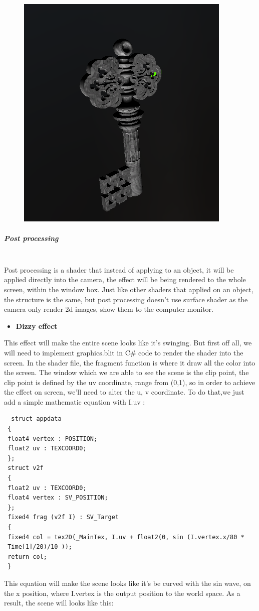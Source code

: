 \documentclass[a4paper, 13pt]{extarticle}
\begin{document}
{\begin{figure}[h]
			\begin{minipage}{1\textwidth}
				\centering
				\includegraphics[width=0.3\linewidth]{intructions/light_react.png}
				\centering
			\end{minipage}
	\end{figure}
\subparagraph{Post processing} ~\\
Post processing is a shader that instead of applying to an object, it will be applied directly into the camera, the effect will be being rendered to the whole screen, within the window box. Just like other shaders that applied on an object, the structure is the same, but post processing doesn't use surface shader as the camera only render 2d images, show them to the computer monitor.
\begin{itemize}
	\item \bfseries Dizzy effect 
\end{itemize} 
 This effect will make the entire scene looks like it's swinging. But first off all, we will need to implement graphics.blit in C\# code to render the shader into the screen. In the shader file, the fragment function is where it draw all the color into the screen. The window which we are able to see the scene is the clip point, the clip point is defined by the uv coordinate, range from (0,1), so in order to achieve the effect on screen, we'll need to alter the u, v coordinate. To do that,we just add a simple mathematic equation with I.uv : 
 \begin{lstlisting}
  struct appdata
 {
 float4 vertex : POSITION;
 float2 uv : TEXCOORD0;
 };
 struct v2f
 {
 float2 uv : TEXCOORD0;
 float4 vertex : SV_POSITION;
 };
 fixed4 frag (v2f I) : SV_Target
 {
 fixed4 col = tex2D(_MainTex, I.uv + float2(0, sin (I.vertex.x/80 * _Time[1]/20)/10 ));
 return col;
 }
 \end{lstlisting} 
 This equation will make the scene looks like it's be curved with the sin wave, on the x position, where I.vertex is the output position to the world space. As a result, the scene will looks like this: 
 \newpage
 ~
 \begin{figure}[h] 

\end{figure}}
\end{document}
